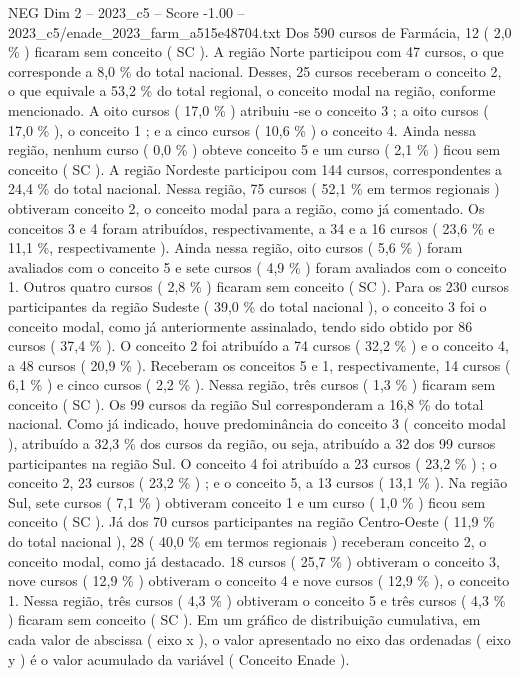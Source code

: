 \begin{textsample}{NEG Dim 2 – 2023\_c5 – Score -1.00 – 2023\_c5/enade\_2023\_farm\_a515e48704.txt}
Dos 590 cursos de Farmácia, 12 ( 2,0 \% ) ficaram sem conceito ( SC ).
A região Norte participou com 47 cursos, o que corresponde a 8,0 \% do total nacional.
Desses, 25 cursos receberam o conceito 2, o que equivale a 53,2 \% do total regional, o conceito modal na região, conforme mencionado.
A oito cursos ( 17,0 \% ) atribuiu -se o conceito 3 ; a oito cursos ( 17,0 \% ), o conceito 1 ; e a cinco cursos ( 10,6 \% ) o conceito 4.
Ainda nessa região, nenhum curso ( 0,0 \% ) obteve conceito 5 e um curso ( 2,1 \% ) ficou sem conceito ( SC ).
A região Nordeste participou com 144 cursos, correspondentes a 24,4 \% do total nacional.
Nessa região, 75 cursos ( 52,1 \% em termos regionais ) obtiveram conceito 2, o conceito modal para a região, como já comentado.
Os conceitos 3 e 4 foram atribuídos, respectivamente, a 34 e a 16 cursos ( 23,6 \% e 11,1 \%, respectivamente ).
Ainda nessa região, oito cursos ( 5,6 \% ) foram avaliados com o conceito 5 e sete cursos ( 4,9 \% ) foram avaliados com o conceito 1.
Outros quatro cursos ( 2,8 \% ) ficaram sem conceito ( SC ).
Para os 230 cursos participantes da região Sudeste ( 39,0 \% do total nacional ), o conceito 3 foi o conceito modal, como já anteriormente assinalado, tendo sido obtido por 86 cursos ( 37,4 \% ).
O conceito 2 foi atribuído a 74 cursos ( 32,2 \% ) e o conceito 4, a 48 cursos ( 20,9 \% ).
Receberam os conceitos 5 e 1, respectivamente, 14 cursos ( 6,1 \% ) e cinco cursos ( 2,2 \% ).
Nessa região, três cursos ( 1,3 \% ) ficaram sem conceito ( SC ).
Os 99 cursos da região Sul corresponderam a 16,8 \% do total nacional.
Como já indicado, houve predominância do conceito 3 ( conceito modal ), atribuído a 32,3 \% dos cursos da região, ou seja, atribuído a 32 dos 99 cursos participantes na região Sul.
O conceito 4 foi atribuído a 23 cursos ( 23,2 \% ) ; o conceito 2, 23 cursos ( 23,2 \% ) ; e o conceito 5, a 13 cursos ( 13,1 \% ).
Na região Sul, sete cursos ( 7,1 \% ) obtiveram conceito 1 e um curso ( 1,0 \% ) ficou sem conceito ( SC ).
Já dos 70 cursos participantes na região Centro-Oeste ( 11,9 \% do total nacional ), 28 ( 40,0 \% em termos regionais ) receberam conceito 2, o conceito modal, como já destacado. 18 cursos ( 25,7 \% ) obtiveram o conceito 3, nove cursos ( 12,9 \% ) obtiveram o conceito 4 e nove cursos ( 12,9 \% ), o conceito 1.
Nessa região, três cursos ( 4,3 \% ) obtiveram o conceito 5 e três cursos ( 4,3 \% ) ficaram sem conceito ( SC ).
Em um gráfico de distribuição cumulativa, em cada valor de abscissa ( eixo x ), o valor apresentado no eixo das ordenadas ( eixo y ) é o valor acumulado da variável ( Conceito Enade ).

\end{textsample}
